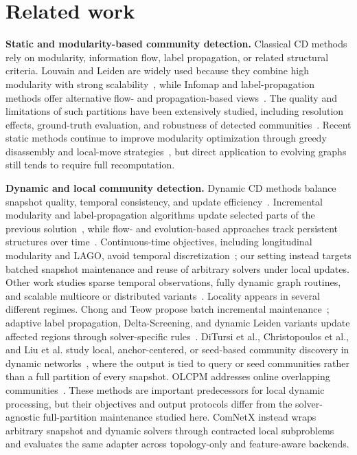 \documentclass[conference]{IEEEtran}
\theoremstyle{definition}
\begin{document}
\section{Related work} \label{S:5}
\textbf{Static and modularity-based community detection.} Classical CD methods
rely on modularity, information flow, label propagation, or related structural
criteria. Louvain and Leiden are widely used because they combine high
modularity with strong scalability~\cite{BGLL08,TWE19}, while Infomap and
label-propagation methods offer alternative flow- and propagation-based
views~\cite{RB07,SF09,TS23}. The quality and limitations of such partitions
have been extensively studied, including resolution effects, ground-truth
evaluation, and robustness of detected communities~\cite{POM09,YL15,YAT16,FH16}.
Recent static methods continue to improve modularity optimization through
greedy disassembly and local-move strategies~\cite{Rustamaji24,TTB24}, but
direct application to evolving graphs still tends to require full
recomputation.

\textbf{Dynamic and local community detection.} Dynamic CD methods balance
snapshot quality, temporal consistency, and update efficiency~\cite{RC17,CZW23,HKT17,Sattar23}.
Incremental modularity and label-propagation algorithms update selected parts
of the previous solution~\cite{CT13,SLX14,MZW20,ZCL19,Seif20,XCS13,HLS17}, while
flow- and evolution-based approaches track persistent structures over
time~\cite{Bov22,Sun22,Mazza23}.
Continuous-time objectives, including longitudinal modularity and LAGO, avoid
temporal discretization~\cite{Brabant25}; our setting instead targets batched
snapshot maintenance and reuse of arbitrary solvers under local updates.
Other work studies sparse temporal observations, fully dynamic graph routines,
and scalable multicore or distributed variants~\cite{Conrad25,Blaskovic25,HHC22,SLu24,SKB25,Sattar25}.
Locality appears in several different regimes. Chong and Teow propose batch
incremental maintenance~\cite{CT13}; adaptive label propagation, Delta-Screening,
and dynamic Leiden variants update affected regions through solver-specific
rules~\cite{HLS17,ZK21,SLe24}. DiTursi et al., Christopoulos et al., and Liu
et al. study local, anchor-centered, or seed-based community discovery in
dynamic networks~\cite{DGB17,CBT23,LSS21}, where the output is tied to query or
seed communities rather than a full partition of every snapshot. OLCPM addresses
online overlapping communities~\cite{BCA18}. These methods are important
predecessors for local dynamic processing, but their objectives and output
protocols differ from the solver-agnostic full-partition maintenance studied
here. ComNetX instead wraps arbitrary snapshot and dynamic solvers through
contracted local subproblems and evaluates the same adapter across topology-only
and feature-aware backends.
\end{document}
